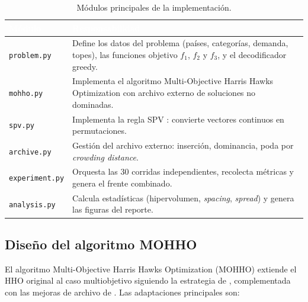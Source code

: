 \documentclass[12pt,letterpaper]{article}
\begin{document}
\begin{table}[H]
\centering
\caption{Módulos principales de la implementación.}
\label{tab:modulos}
\renewcommand{\arraystretch}{1.4}
\begin{tabular}{lp{8cm}}
\toprule
\rowcolor{tablehead}
\textcolor{white}{\textbf{Módulo}} & \textcolor{white}{\textbf{Responsabilidad}} \\
\midrule
\texttt{problem.py} & Define los datos del problema (países, categorías, demanda, topes), las funciones objetivo $f_1$, $f_2$ y $f_3$, y el decodificador greedy. \\
\rowcolor{gray!8}
\texttt{mohho.py} & Implementa el algoritmo Multi-Objective Harris Hawks Optimization con archivo externo de soluciones no dominadas. \\
\texttt{spv.py} & Implementa la regla SPV \parencite{bean1994}: convierte vectores continuos en permutaciones. \\
\rowcolor{gray!8}
\texttt{archive.py} & Gestión del archivo externo: inserción, dominancia, poda por \textit{crowding distance}. \\
\texttt{experiment.py} & Orquesta las 30 corridas independientes, recolecta métricas y genera el frente combinado. \\
\rowcolor{gray!8}
\texttt{analysis.py} & Calcula estadísticas (hipervolumen, \textit{spacing}, \textit{spread}) y genera las figuras del reporte. \\
\bottomrule
\end{tabular}
\end{table}

\subsection{Diseño del algoritmo MOHHO}

El algoritmo Multi-Objective Harris Hawks Optimization (MOHHO) extiende el HHO original \parencite{heidari2019} al caso multiobjetivo siguiendo la estrategia de \textcite{kusoglu2020}, complementada con las mejoras de archivo de \textcite{cerci2022}. Las adaptaciones principales son:
\end{document}
